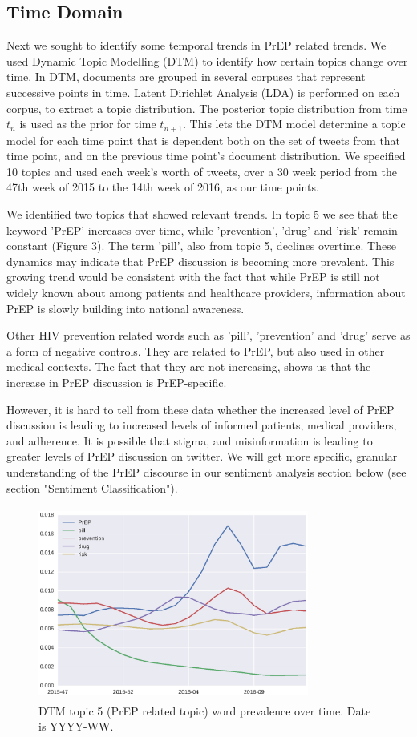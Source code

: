 \documentclass{sig-alternate-05-2015}
\begin{document}
\subsection{Time Domain}

Next we sought to identify some temporal trends in PrEP related trends. We used Dynamic Topic Modelling (DTM) to identify how certain topics change over time. In DTM, documents are grouped in several corpuses that represent successive points in time. Latent Dirichlet Analysis (LDA) is performed on each corpus, to extract a topic distribution. The posterior topic distribution from time $t_n$ is used as the prior for time $t_{n+1}$. This lets the DTM model determine a topic model for each time point that is dependent both on the set of tweets from that time point, and on the previous time point's document distribution. We specified 10 topics and used each week's worth of tweets, over a 30 week period from the 47th week of 2015 to the 14th week of 2016, as our time points.

We identified two topics that showed relevant trends. In topic 5 we see that the keyword 'PrEP' increases over time, while 'prevention', 'drug' and 'risk' remain constant (Figure 3). The term 'pill', also from topic 5, declines overtime. These dynamics may indicate that PrEP discussion is becoming more prevalent. This growing trend would be consistent with the fact that while PrEP is still not widely known about among patients and healthcare providers, information about PrEP is slowly building into national awareness.

Other HIV prevention related words such as 'pill', 'prevention' and 'drug' serve as a form of negative controls. They are related to PrEP, but also used in other medical contexts. The fact that they are not increasing, shows us that the increase in PrEP discussion is PrEP-specific.

However, it is hard to tell from these data whether the increased level of PrEP discussion is leading to increased levels of informed patients, medical providers, and adherence. It is possible that stigma, and misinformation is leading to greater levels of PrEP discussion on twitter. We will get more specific, granular understanding of the PrEP discourse in our sentiment analysis section below (see section "Sentiment Classification").

\begin{figure}
\centering
\includegraphics[height=2.5in, width=3.5in]{DTMfig1}
\caption{DTM topic 5 (PrEP related topic) word prevalence over time. Date is YYYY-WW.}
\end{figure}
\end{document}
